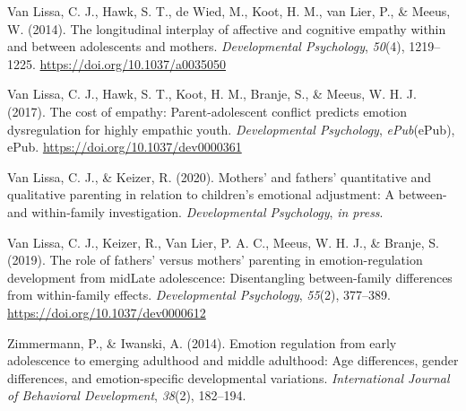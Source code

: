 \documentclass[
  english,
  man]{apa6}
\begin{document}
\leavevmode\hypertarget{ref-vanlissaLongitudinalInterplayAffective2014}{}%
Van Lissa, C. J., Hawk, S. T., de Wied, M., Koot, H. M., van Lier, P., \& Meeus, W. (2014). The longitudinal interplay of affective and cognitive empathy within and between adolescents and mothers. \emph{Developmental Psychology}, \emph{50}(4), 1219--1225. \url{https://doi.org/10.1037/a0035050}

\leavevmode\hypertarget{ref-vanlissaCostEmpathyParentadolescent2017}{}%
Van Lissa, C. J., Hawk, S. T., Koot, H. M., Branje, S., \& Meeus, W. H. J. (2017). The cost of empathy: Parent-adolescent conflict predicts emotion dysregulation for highly empathic youth. \emph{Developmental Psychology}, \emph{ePub}(ePub), ePub. \url{https://doi.org/10.1037/dev0000361}

\leavevmode\hypertarget{ref-vanlissaMothersFathersQuantitative2020}{}%
Van Lissa, C. J., \& Keizer, R. (2020). Mothers' and fathers' quantitative and qualitative parenting in relation to children's emotional adjustment: A between- and within-family investigation. \emph{Developmental Psychology}, \emph{in press}.

\leavevmode\hypertarget{ref-vanlissaRoleFathersMothers2019}{}%
Van Lissa, C. J., Keizer, R., Van Lier, P. A. C., Meeus, W. H. J., \& Branje, S. (2019). The role of fathers' versus mothers' parenting in emotion-regulation development from midLate adolescence: Disentangling between-family differences from within-family effects. \emph{Developmental Psychology}, \emph{55}(2), 377--389. \url{https://doi.org/10.1037/dev0000612}

\leavevmode\hypertarget{ref-zimmermannEmotionRegulationEarly2014}{}%
Zimmermann, P., \& Iwanski, A. (2014). Emotion regulation from early adolescence to emerging adulthood and middle adulthood: Age differences, gender differences, and emotion-specific developmental variations. \emph{International Journal of Behavioral Development}, \emph{38}(2), 182--194.

\endgroup
\end{document}
